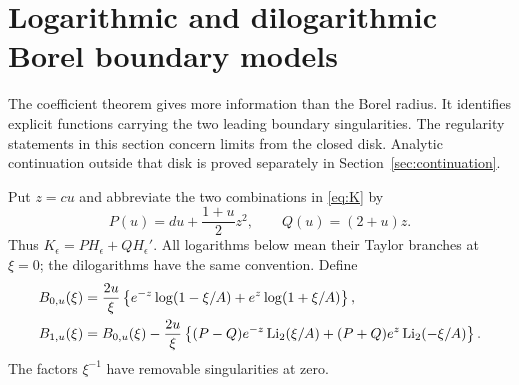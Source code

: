 \section{Logarithmic and dilogarithmic Borel boundary models}
\label{sec:Borel}

The coefficient theorem gives more information than the Borel radius. It
identifies explicit functions carrying the two leading boundary
singularities. The regularity statements in this section concern limits
from the closed disk. Analytic continuation outside that disk is proved
separately in Section~\ref{sec:continuation}.

Put $z=cu$ and abbreviate the two combinations in \eqref{eq:K} by
\begin{equation}\label{eq:PQ}
 P(u)=du+\frac{1+u}{2}z^2,\qquad Q(u)=(2+u)z.
\end{equation}
Thus $K_\epsilon=P H_\epsilon+QH_\epsilon'$.
All logarithms below mean their Taylor branches at $\xi=0$; the
dilogarithms have the same convention. Define
\begin{align}
 B_{0,u}(\xi)
 &=\frac{2u}{\xi}
 \left\{e^{-z}\log(1-\xi/A)+e^z\log(1+\xi/A)\right\},
 \label{eq:B0-model}\\
 B_{1,u}(\xi)
 &=B_{0,u}(\xi)-\frac{2u}{\xi}
 \left\{(P-Q)e^{-z}\operatorname{Li}_2(\xi/A)
                  +(P+Q)e^z\operatorname{Li}_2(-\xi/A)\right\}.
 \label{eq:B1-model}
\end{align}
The factors $\xi^{-1}$ have removable singularities at zero.

